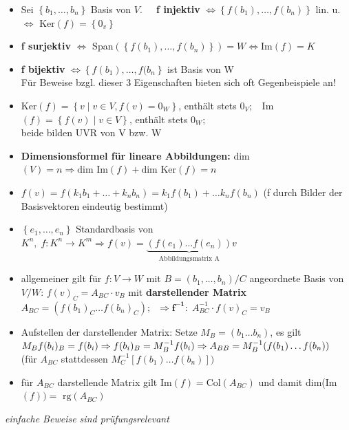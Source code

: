 \documentclass[10pt,a4paper]{article}
\begin{document}
\begin{itemize}
\item Sei $\left\lbrace b_{1},\dotsc,b_{n}\right\rbrace$ Basis von $V.\;\;\;\;$   \textbf{f injektiv} $\Leftrightarrow \left\lbrace f(b_{1}), \dotsc,f(b_{n}) \right\rbrace $ lin. u. $\Leftrightarrow$ Ker$(f)=\left\lbrace 0_{v} \right\rbrace$
\item \textbf{f surjektiv} $\Leftrightarrow$ Span$(\left\lbrace f(b_{1}), \dotsc,f(b_{n}) \right\rbrace)=W\Leftrightarrow\text{Im}(f)=K$
\item \textbf{f bijektiv} $\Leftrightarrow \left\lbrace f(b_{1}), \dotsc,f(b_{n}\right\rbrace$ ist Basis von W\\ Für Beweise bzgl. dieser 3 Eigenschaften bieten sich oft Gegenbeispiele an!
\item Ker$(f)=\left\lbrace v \mid v \in V, f(v)=0_{W}\right\rbrace$, enthält stets $0_{V};\;\;$ Im$(f)=\left\lbrace f(v) \mid v\in V\right\rbrace$, enthält stets $0_{W};$\\ beide bilden UVR von V bzw. W 
\item \textbf{Dimensionsformel für lineare Abbildungen:} dim$(V)=n\Rightarrow\text{dim Im}(f)+\text{dim Ker}(f)=n$
\item $f(v)=f(k_{1}b_{1}+\dotsc + k_{n}b_{n})=k_{1}f(b_{1})+\dotsc k_{n}f(b_{n})$ (f durch Bilder der Basisvektoren eindeutig bestimmt)
\item $\left\lbrace e_{1},\dotsc,e_{n}\right\rbrace$ Standardbasis von $K^{n},\;f: K^{n}\rightarrow K^{m}\Rightarrow f(v)=\underbrace{(f(e_{1})\dotsc f(e_{n}))}_{\text{Abbildungsmatrix A}}v$
\item allgemeiner gilt für $f:V\rightarrow W$ mit $B=(b_{1},\dotsc,b_{n})/C$ angeordnete Basis von $V/W$: $f(v)_{C}=A_{BC}\cdot v_{B}$ mit \textbf{darstellender Matrix} $A_{BC}=(f(b_{1})_{C}\dotsc f(b_{n})_{C});\;\;\Rightarrow\boldsymbol{f^{-1}:}\; A_{BC}^{-1}\cdot f(v)_{C}=v_{B} $ 
\item Aufstellen der darstellender Matrix: Setze $M_{B}=(b_{1} \dotsc b_{n})$, es gilt $M_{B}f(b_{i})_{B}=f(b_{i})\Rightarrow f(b_{i})_{B}= M_{B}^{-1}f(b_{i})\\ \Rightarrow A_{BB}=M_{B}^{-1}(f(b_{1})\dotsc f(b_{n}))\;\;\;\;$ (für $A_{BC}$ stattdessen $M_{C}^{-1}[f(b_{1})\dotsc f(b_{n})])$
\item für $A_{BC}$ darstellende Matrix gilt Im$(f)=\text{Col}(A_{BC})$ und damit dim(Im$(f))=\text{ rg}(A_{BC})$
\end{itemize}
\textit{einfache Beweise sind prüfungsrelevant}
\end{document}
